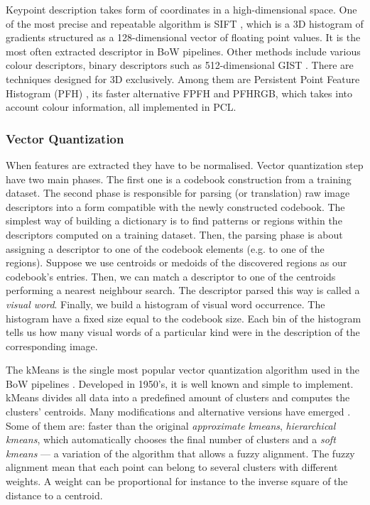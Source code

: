 		Keypoint description takes form of coordinates in a high-dimensional space. One of the most precise and repeatable algorithm is SIFT \cite{sift_features}, which is a 3D histogram of gradients structured as a 128-dimensional vector of floating point values. It is the most often extracted descriptor in BoW pipelines. Other methods include various colour descriptors, binary descriptors such as 512-dimensional GIST \cite{ponce2011cv}. There are techniques designed for 3D exclusively. Among them are Persistent Point Feature Histogram (PFH) \cite{pfh_rusu2008}, its faster alternative FPFH \cite{fpfh_rusu2009} and PFHRGB, which takes into account colour information, all implemented in PCL.
		
		\subsubsection{Vector Quantization}
		When features are extracted they have to be normalised. Vector quantization step have two main phases. The first one is a codebook construction from a training dataset. The second phase is responsible for parsing (or translation) raw image descriptors into a form compatible with the newly constructed codebook. The simplest way of building a dictionary is to find patterns or regions within the descriptors computed on a training dataset. Then, the parsing phase is about assigning a descriptor to one of the codebook elements (e.g. to one of the regions). Suppose we use centroids or medoids of the discovered regions as our codebook's entries. Then, we can match a descriptor to one of the centroids performing a nearest neighbour search. The descriptor parsed this way is called a \textit{visual word}. Finally, we build a histogram of visual word occurrence. The histogram have a fixed size equal to the codebook size. Each bin of the histogram tells us how many visual words of a particular kind were in the description of the corresponding image.
		
		The kMeans is the single most popular vector quantization algorithm used in the BoW pipelines \cite{tsai2012bag}. Developed in 1950's, it is well known and simple to implement. kMeans divides all data into a predefined amount of clusters and computes the clusters' centroids. Many modifications and alternative versions have emerged \cite{kmeans_jain2010data}. Some of them are: faster than the original \emph{approximate kmeans}, \emph{hierarchical kmeans}, which automatically chooses the final number of clusters and a \emph{soft kmeans} --- a variation of the algorithm that allows a fuzzy alignment. The fuzzy alignment mean that each point can belong to several clusters with different weights. A weight can be proportional for instance to the inverse square of the distance to a centroid. 
		

